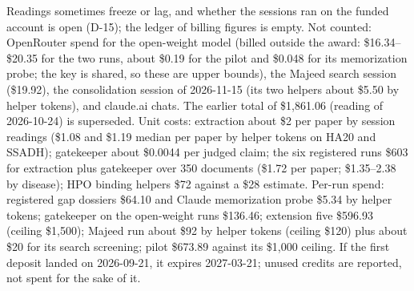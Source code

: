 \documentclass{article} %
\begin{document}
Readings sometimes freeze or lag, and whether the sessions ran on the funded account is open (D-15); the ledger of billing figures is empty. Not counted: OpenRouter spend for the open-weight model (billed outside the award: \$16.34--\$20.35 for the two runs, about \$0.19 for the pilot and \$0.048 for its memorization probe; the key is shared, so these are upper bounds), the Majeed search session (\$19.92), the consolidation session of 2026-11-15 (its two helpers about \$5.50 by helper tokens), and claude.ai chats. The earlier total of \$1,861.06 (reading of 2026-10-24) is superseded. Unit costs: extraction about \$2 per paper by session readings (\$1.08 and \$1.19 median per paper by helper tokens on HA20 and SSADH); gatekeeper about \$0.0044 per judged claim; the six registered runs \$603 for extraction plus gatekeeper over 350 documents (\$1.72 per paper; \$1.35--2.38 by disease); HPO binding helpers \$72 against a \$28 estimate. Per-run spend: registered gap dossiers \$64.10 and Claude memorization probe \$5.34 by helper tokens; gatekeeper on the open-weight runs \$136.46; extension five \$596.93 (ceiling \$1,500); Majeed run about \$92 by helper tokens (ceiling \$120) plus about \$20 for its search screening; pilot \$673.89 against its \$1,000 ceiling. If the first deposit landed on 2026-09-21, it expires 2027-03-21; unused credits are reported, not spent for the sake of it.
\end{document}
